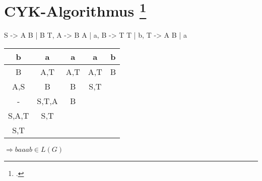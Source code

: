 \documentclass{lehramt-informatik-aufgabe}
\begin{document}
\section{CYK-Algorithmus
\footcite[Seite 46]{theo:fs:2}}

\begin{liProduktionsRegeln}
S -> A B | B T,
A -> B A | a,
B -> T T | b,
T -> A B | a
\end{liProduktionsRegeln}

\begin{liAntwort}
\begin{tabular}{|c|c|c|c|c|}
b     & a     & a   & a   & b \\\hline\hline

B     & A,T   & A,T & A,T & B \\\cline{1-5}
A,S   & B     & B   & S,T \\\cline{1-4}
-     & S,T,A & B \\\cline{1-3}
S,A,T & S,T \\\cline{1-2}
S,T   \\\cline{1-1}
\end{tabular}

\bigskip
\noindent
$\Rightarrow baaab \in L(G)$
\end{liAntwort}
\end{document}
